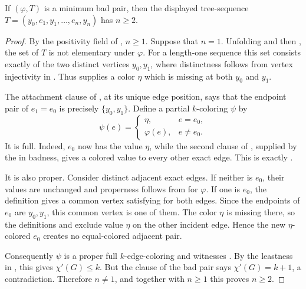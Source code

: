 \begin{helper}
If \((\varphi,T)\) is a minimum bad pair, then the displayed
tree-sequence \(T=(y_0,e_1,y_1,\ldots,e_n,y_n)\) has \(n\geq2\).
\end{helper}
\begin{proof}
By the positivity field of , \(n\geq1\).  Suppose
that \(n=1\).  Unfolding  and then
, the set  of
\(T\) is not elementary under \(\varphi\).  For a length-one sequence this
set consists exactly of the two distinct vertices \(y_0,y_1\), where
distinctness follows from vertex injectivity in .
Thus  supplies a color \(\eta\) which
is missing at both \(y_0\) and \(y_1\).

The attachment clause of , at its unique edge
position, says that the endpoint pair of \(e_1=e_0\) is precisely
\(\{y_0,y_1\}\).  Define a partial \(k\)-coloring \(\psi\) by
\[
 \psi(e)=\begin{cases}\eta,&e=e_0,\\ \varphi(e),&e\ne e_0.\end{cases}
\]
It is full.  Indeed, \(e_0\) now has the value \(\eta\), while the second
clause of , supplied by the
 in badness, gives a colored value to every other exact
edge.  This is exactly .

It is also proper.  Consider distinct adjacent exact edges.  If neither
is \(e_0\), their values are unchanged and properness follows from
 for \(\varphi\).  If one is \(e_0\), the
definition  gives a common vertex satisfying
 for both edges.  Since the endpoints of \(e_0\) are
\(y_0,y_1\), this
common vertex is one of them.  The color \(\eta\) is missing there, so
the definitions  and 
exclude value \(\eta\) on the other incident edge.  Hence the new
\(\eta\)-colored \(e_0\) creates no equal-colored adjacent pair.

Consequently \(\psi\) is a proper full \(k\)-edge-coloring and witnesses
.  By the leastness in
, this gives \(\chi'(G)\leq k\).  But the
 clause of the bad pair says
\(\chi'(G)=k+1\), a contradiction.  Therefore \(n\ne1\), and together
with \(n\geq1\) this proves \(n\geq2\).
\end{proof}
